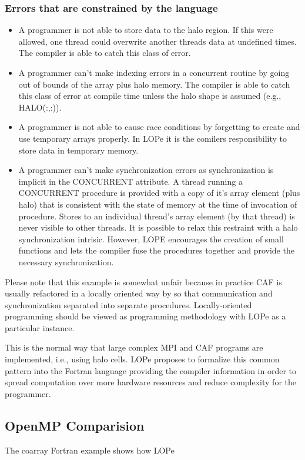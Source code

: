 \subsubsection{Errors that are constrained by the language}
\begin{itemize}

\item
A programmer is not able to store data to the halo region.  If this were
allowed, one thread could overwrite another threads data at undefined times.
The compiler is able to catch this class of error.

\item
A programmer can't make indexing errors in a concurrent routine by going out of
bounds of the array plus halo memory.  The compiler is able to catch this class of
error at compile time unless the halo shape is assumed (e.g., HALO(:,:)).

\item
A programmer is not able to cause race conditions by forgetting to create and
use temporary arrays properly.  In LOPe it is the comilers responsibility to
store data in temporary memory.

\item
A programmer can't make synchronization errors as synchronization is implicit in
the CONCURRENT attribute.  A thread running a CONCURRENT procedure is provided
with a copy of it's array element (plus halo) that is consistent with the state
of memory at the time of invocation of procedure.  Stores to an individual
thread's array element (by that thread) is never visible to other threads.
It is possible to relax this restraint with a halo synchronization intrisic.
However, LOPE encourages the creation of small functions and lets the compiler
fuse the procedures together and provide the necessary synchronization.

\end{itemize}

Please note that this example is somewhat unfair because in practice CAF is usually
refactored in a locally oriented way by so that communication and
synchronization separated into separate procedures.  Locally-oriented programming should be viewed as programming methodology with LOPe as a particular instance.

This is the normal way that large complex MPI and CAF programs are implemented, i.e., using
halo cells.  LOPe proposes to formalize this common pattern into the Fortran
language providing the compiler information in order to spread computation over
more hardware resources and reduce complexity for the programmer.


\subsection{OpenMP Comparision}

The coarray Fortran example shows how LOPe 
